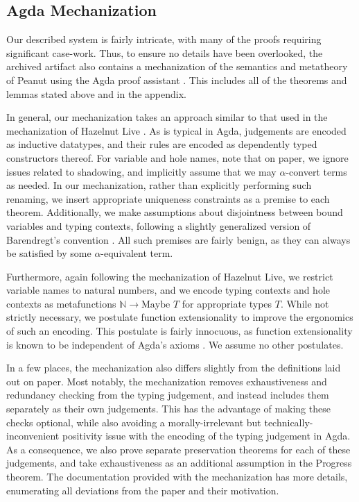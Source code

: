 \subsection{Agda Mechanization}
\label{sec:agda}

Our described system is fairly intricate, with many of the proofs requiring significant case-work. Thus, to ensure no details have been overlooked, the archived artifact also contains a mechanization of the semantics and metatheory of Peanut using the Agda proof assistant \cite{norell:thesis}. This includes all of the theorems and lemmas stated above and in the appendix. 

In general, our mechanization takes an approach similar to that used in the mechanization of Hazelnut Live \cite{DBLP:journals/pacmpl/OmarVCH19}. As is typical in Agda, judgements are encoded as inductive datatypes, and their rules are encoded as dependently typed constructors thereof. For variable and hole names, note that on paper, we ignore issues related to shadowing, and implicitly assume that we may $\alpha$-convert terms as needed. In our mechanization, rather than explicitly performing such renaming, we insert appropriate uniqueness constraints as a premise to each theorem. Additionally, we make assumptions about disjointness between bound variables and typing contexts, following a slightly generalized version of Barendregt’s convention \cite{DBLP:books/daglib/0067558, DBLP:conf/cade/UrbanBN07}. All such premises are fairly benign, as they can always be satisfied by some $\alpha$-equivalent term.

Furthermore, again following the mechanization of Hazelnut Live, we restrict variable names to natural numbers, and we encode typing contexts and hole contexts as metafunctions $\mathbb{N} \to \text{Maybe } T$ for appropriate types $T$. While not strictly necessary, we postulate function extensionality to improve the ergonomics of such an encoding. This postulate is fairly innocuous, as function extensionality is known to be independent of Agda’s axioms \cite{DBLP:conf/lics/AwodeyGS12}. We assume no other postulates.

In a few places, the mechanization also differs slightly from the definitions laid out on paper. Most notably, the mechanization removes exhaustiveness and redundancy checking from the typing judgement, and instead includes them separately as their own judgements. This has the advantage of making these checks optional, while also avoiding a morally-irrelevant but technically-inconvenient positivity issue with the encoding of the typing judgement in Agda. As a consequence, we also prove separate preservation theorems for each of these judgements, and take exhaustiveness as an additional assumption in the Progress theorem. The documentation provided with the mechanization has more details, enumerating all deviations from the paper and their motivation.